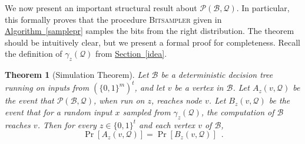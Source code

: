 \documentclass[11pt]{article}
\numberwithin{equation}{section}
\newtheorem{theorem}{Theorem}[section]
\theoremstyle{definition}
\theoremstyle{plain}
\newcommand{\expref}[2]{\hyperref[#2]{#1~\ref{#2}}}
\newcommand{\clB}{\mathcal{B}}
\newcommand{\clQ}{\mathcal{Q}}
\newcommand{\clP}{\mathcal{P}}
\begin{document}
We now present an important structural result about $\clP (\clB, \clQ)$.  In particular, this formally proves that the procedure \textsc{Bitsampler} given in \expref{Algorithm}{samplepr} samples the bits from the right distribution. The theorem should be intuitively clear, but we present a formal proof for completeness. Recall the definition of $\gamma_z(\clQ)$ from \expref{Section}{idea}.
\begin{theorem}[Simulation Theorem]
\label{samedistn}
Let $\clB$ be a deterministic decision tree running on inputs from $(\{0,1\}^m)^t$, and let $v$ be a vertex in $\clB$. 
Let $A_z(v, \clQ)$ be the event that $\clP (\clB, \clQ)$, when run on $z$, reaches node $v$.  
Let $B_z(v, \clQ)$ be the event that for a random input $x$ sampled from $\gamma_z(\clQ)$, the computation of $\clB$ reaches $v$. 
Then for every $z \in \{0,1\}^t$ and each vertex $v$ of $\clB$, 
\[
\Pr[A_z(v,\clQ)] =\Pr[B_z(v,\clQ)] \enspace .
\]
\end{theorem}
\end{document}
